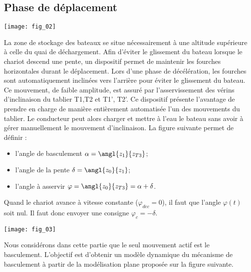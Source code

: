 \subsection*{Phase de déplacement}

\ifprof
\else

\begin{marginfigure}
\texttt{[image: fig\_02]}
\end{marginfigure}

La zone de stockage des bateaux se situe nécessairement à une altitude supérieure à celle du quai de déchargement. Afin d’éviter le glissement du bateau lorsque le chariot descend une pente, un dispositif permet de maintenir les fourches horizontales durant le déplacement. Lors d’une phase de décélération, les fourches sont automatiquement inclinées vers l’arrière pour éviter le glissement du bateau. Ce mouvement, de faible amplitude, est assuré par l’asservissement des vérins d’inclinaison du tablier T1,T2 et T1’, T2’. Ce dispositif présente l’avantage de prendre en charge de manière entièrement automatisée l’un des mouvements du tablier. Le conducteur peut alors charger et mettre à l’eau le bateau sans avoir à gérer manuellement le mouvement d’inclinaison.
La figure suivante permet de définir :
\begin{itemize}
\item l'angle de basculement $\alpha=\angl{z_1}{z_{T3}}$;
\item l'angle de la pente $\delta=\angl{z_0}{z_1}$;
\item l'angle à asservir  $\varphi=\angl{z_0}{z_{T3}}=\alpha+\delta$.
\end{itemize}


\fi


\ifprof
\begin{corrige}
 Quand le chariot avance à vitesse constante ($\varphi_{dec}=0$), il faut que l'angle $\varphi(t)$ soit nul. Il faut donc envoyer une consigne  $\varphi_c = -\delta$.
\end{corrige}
\else
\fi


\ifprof
\else


\begin{marginfigure}
\texttt{[image: fig\_03]}
\end{marginfigure}

Nous considérons dans cette partie que le seul mouvement actif est le basculement.
L’objectif est d’obtenir un modèle dynamique du mécanisme de basculement à partir de la modélisation plane proposée sur la figure suivante.


